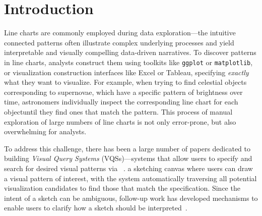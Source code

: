 \vspace{-5pt}
\section{Introduction\label{sec:intro}}
Line charts are commonly employed during data exploration---the intuitive connected patterns often illustrate complex underlying processes
and yield interpretable and visually compelling data-driven narratives. To discover patterns in line charts, analysts construct them
using toolkits like \texttt{ggplot} or \texttt{matplotlib}, or visualization construction interfaces like Excel or Tableau, specifying
{\em exactly} what they want to visualize. For example, when trying to find celestial objects corresponding to supernovae, which have a specific pattern of brightness over time, astronomers individually inspect the corresponding line chart for each objectuntil they find ones that match the pattern.  This process of manual exploration of large numbers of line charts  is not only error-prone, but also overwhelming for analysts.
\par To address this challenge, there has been a large number of papers dedicated to building {\em Visual Query Systems} (VQSs)---systems that allow users to specify and search for desired visual patterns via ~\cite{mohebbi2011google,Hochheiser2004,wattenberg2001sketching,Siddiqui2017VLDB,ryall2005querylines,correll2016semantics,Mannino2018,Eichmann2015,Holz2009}.  a sketching canvas where users can draw a visual pattern of interest, with the system automatically traversing all potential visualization candidates to find those that match the specification. Since the intent of a sketch can be ambiguous, follow-up work has developed mechanisms to enable users to clarify how a sketch should be interpreted~\cite{ryall2005querylines,correll2016semantics,Mannino2018,Eichmann2015,Holz2009}.
